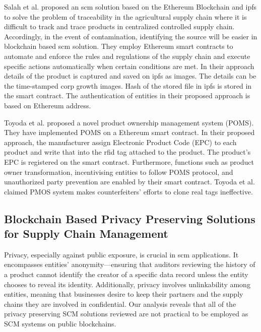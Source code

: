 Salah et al. \cite{Salah2019} proposed an \gls{scm} solution based on the Ethereum Blockchain and \gls{ipfs} to solve the problem of traceability in the agricultural supply chain where it is difficult to track and trace products in centralized controlled supply chain. Accordingly, in the event of contamination, identifying the source will be easier in blockchain based \gls{scm} solution. They employ Ethereum smart contracts to automate and enforce the rules and regulations of the supply chain and execute specific actions automatically when certain conditions are met. In their approach details of the product is captured and saved on \gls{ipfs} as images. The details can be the time-stamped corp growth images. Hash of the stored file in \gls{ipfs} is stored in the smart contract. The authentication of entities in their proposed approach is based on Ethereum address.

Toyoda et al. \cite{Toyoda2017} proposed a novel product ownership management system (POMS). They have implemented POMS on a Ethereum smart contract. In their proposed approach, the manufacturer assign Electronic Product Code (EPC) to each product and write that into the \gls{rfid} tag attached to the product. The product's EPC is registered on the smart contract. Furthermore, functions such as product owner transformation, incentivising entities to follow POMS protocol, and unauthorized party prevention are enabled by their smart contract. Toyoda et al. claimed PMOS system makes counterfeiters' efforts to clone real tags ineffective. 


\subsection{Blockchain Based Privacy Preserving Solutions for Supply Chain Management}\label{sec:lit_pp_bc_scm}

Privacy, especially against public exposure, is crucial in \gls{scm} applications. It encompasses entities' anonymity—ensuring that auditors reviewing the history of a product cannot identify the creator of a specific data record unless the entity chooses to reveal its identity. Additionally, privacy involves unlinkability among entities, meaning that businesses desire to keep their partners and the supply chains they are involved in confidential. Our analysis reveals that all of the privacy preserving SCM solutions reviewed are not practical to be employed as SCM systems on public blockchains. 

